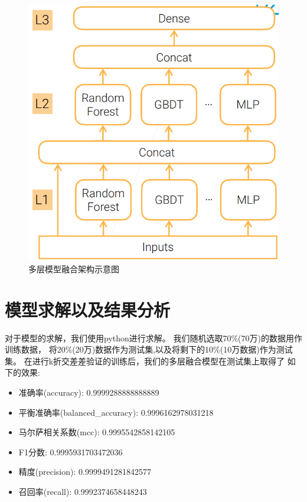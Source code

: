 \documentclass[withoutpreface,bwprint]{cumcmthesis} %
\begin{document}
        \begin{figure}[H]
      
                \centering
                \includegraphics[scale=0.3]{images/stack.png}
                \caption{多层模型融合架构示意图}
                \label{fig1b}

   
    \end{figure}
        \section{模型求解以及结果分析}


       对于模型的求解，我们使用python进行求解。 
       我们随机选取70\%(70万)的数据用作训练数据，
       将20\%(20万)数据作为测试集,以及将剩下的10\%(10万数据)作为测试集。
       在进行k折交差差验证的训练后，我们的多层融合模型在测试集上取得了
       如下的效果:
       \begin{itemize}
       \item  准确率(accuracy): 0.9999288888888889
       \item   平衡准确率(balanced\_accuracy): 0.9996162978031218 
       \item   马尔萨相关系数(mcc): 0.9995542858142105
       \item   F1分数: 0.9995931703472036
       \item    精度(precision): 0.9999491281842577
       \item   召回率(recall): 0.9992374658448243
       \end{itemize}
\end{document}
